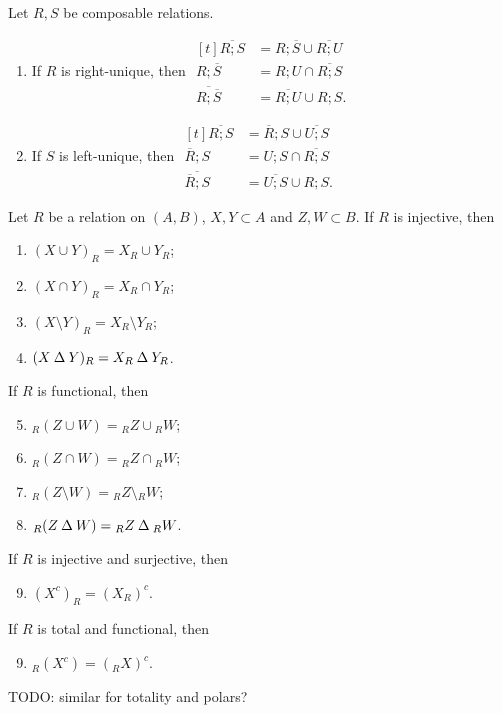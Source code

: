 \begin{lemma} \label{uniquenessResiduals}
Let $R,S$ be composable relations.
\begin{enumerate}
\item If $R$ is right-unique, then $\begin{aligned}[t]
\overline{R;S} &= R;\overline{S} \cup \overline{R;U} \\
R;\overline{S} &= R;U\cap \overline{R;S} \\
\overline{R;\overline{S}} &= \overline{R;U} \cup R;S.
\end{aligned}$
\item If $S$ is left-unique, then $\begin{aligned}[t]
\overline{R;S} &= \overline{R};S \cup \overline{U;S} \\
\overline{R};S &= U;S\cap \overline{R;S} \\
\overline{\overline{R};S} &= \overline{U;S}\cup R;S.
\end{aligned}$
\end{enumerate}
\end{lemma}

\begin{lemma} \label{imagePreimageUniqueness}
Let $R$ be a relation on $(A, B)$, $X,Y\subset A$ and $Z,W\subset B$. If $R$ is injective, then
\begin{enumerate}
\item $(X\cup Y)_R = X_R\cup Y_R$;
\item $(X\cap Y)_R = X_R\cap Y_R$;
\item $(X\setminus Y)_R = X_R\setminus Y_R$;
\item $(X\mathbin{\Delta} Y)_R = X_R\mathbin{\Delta} Y_R$.
\end{enumerate}
If $R$ is functional, then
\begin{enumerate} \setcounter{enumi}{4}
\item $_R(Z\cup W) = {_RZ}\cup {_RW}$;
\item $_R(Z\cap W) = {_RZ}\cap {_RW}$;
\item $_R(Z\setminus W) = {_RZ}\setminus {_RW}$;
\item $_R(Z\mathbin{\Delta} W) = {_RZ}\mathbin{\Delta} {_RW}$.
\end{enumerate}
If $R$ is injective and surjective, then
\begin{enumerate} \setcounter{enumi}{8}
\item $(X^c)_R = (X_R)^c$.
\end{enumerate}
If $R$ is total and functional, then
\begin{enumerate} \setcounter{enumi}{8}
\item ${_R}(X^c) = ({_RX})^c$.
\end{enumerate}
\end{lemma}
TODO: similar for totality and polars?

